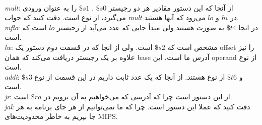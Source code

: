 \\
\emph{mult}:
از آنجا که این دستور مقادیر هر دو رجیستر
$\$s0$
,
$\$s1$
 را به عنوان ورودی می‌گیرد، از نوع
است.
دقت کنید که جواب
\emph{mult}
در
$hi$
و
$lo$
می‌رود که آنها
هستند.
\\
\emph{mflo}:
در انجا
$\$t4$
به صورت
هستند ولی مبدأ جایی که عدد می‌آید از رجیستر
$lo$
است که
است.
\\
\emph{lw}:
مشخص است که
$\$s2$
است. ولی
از انجا که در قسمت دوم دستور یک
offset
را نیز علاوه بر یک رجیستر دریافت می‌کند که همان
base
آدرس ما است، این 
operand
از نوع
است.
\\
\emph{addi}:
$\$s3$ و $\$t6$
از نوع
هستند.
از آنجا که یک عدد ثابت داریم در این قسمت از نوع
است.
\\
\emph{jr}:
از این دستور
است چرا که آدرسی که می‌خواهیم به آن برویم در
$\$ra$
است.
\\
\emph{jal}:
دقت کنید که عملا این دستور
است. چرا که ما نمی‌توانیم از هر جای برنامه به هر جا بپریم به خاطر محدودیت‌های
MIPS.